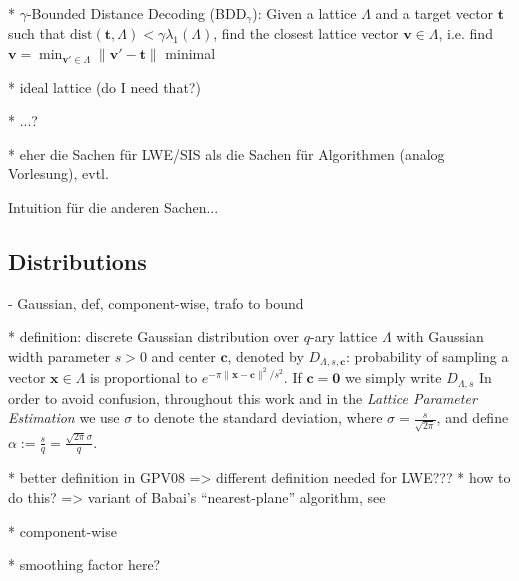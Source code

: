 \documentclass[
  a4paper,  %
  twoside,  %
  bibliography=totoc,
  headsepline,
  cleardoublepage=empty,
  parskip=half,
  draft=false
]{scrbook}
\begin{document}
* $\gamma$-Bounded Distance Decoding (BDD$_\gamma$): Given a lattice $\Lambda$ and a target vector $\mathbf{t}$ such that $\text{dist}(\mathbf{t}, \Lambda) < \gamma \lambda_1(\Lambda)$, find the closest lattice vector $\mathbf{v} \in \Lambda$, i.e. find $\mathbf{v} = \min_{\mathbf{v}' \in \Lambda} \|\mathbf{v}' - \mathbf{t}\|$ minimal \cite{LM09}


* ideal lattice (do I need that?)

* ...?

* eher die Sachen für LWE/SIS als die Sachen für Algorithmen (analog Vorlesung), evtl.

Intuition für die anderen Sachen...



\subsection{Distributions}

- Gaussian, def, component-wise, trafo to bound %

* definition:
discrete Gaussian distribution over $q$-ary lattice $\Lambda$ with Gaussian width parameter $s > 0$ and center $\mathbf{c}$, denoted by $D_{\Lambda, s, \mathbf{c}}$: probability of sampling a vector $\mathbf{x}\in \Lambda$ is proportional to $e^{-\pi \|\mathbf{x} - \mathbf{c}\|^2/s^2}$. If $\mathbf{c} = \mathbf{0}$ we simply write  $D_{\Lambda, s}$ %
In order to avoid confusion, throughout this work and in the \textit{Lattice Parameter Estimation} we use $\sigma$ to denote the standard deviation, where $\sigma = \frac{s}{\sqrt{2 \pi}}$, and define $\alpha := \frac{s}{q} = \frac{\sqrt{2\pi} \sigma}{q}$.

* better definition in GPV08 => different definition needed for LWE??? %
* how to do this? => variant of Babai's ``nearest-plane'' algorithm, see \cite{GPV08} %

* component-wise

* smoothing factor here?
\end{document}
